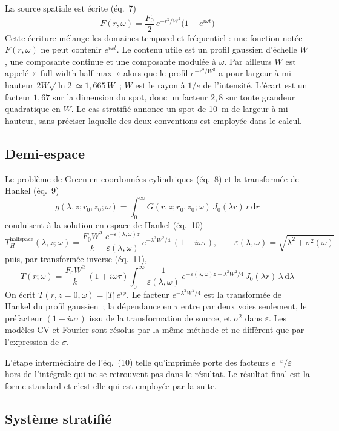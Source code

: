 \documentclass[11pt,a4paper]{article}
\begin{document}
La source spatiale est écrite (éq.~7)
\[
F(r,\omega) = \frac{F_0}{2}\,e^{-r^2/W^2}\big(1 + e^{i\omega t}\big)
\]
Cette écriture mélange les domaines temporel et fréquentiel : une fonction notée $F(r,\omega)$
ne peut contenir $e^{i\omega t}$. Le contenu utile est un profil gaussien d'échelle $W$, une
composante continue et une composante modulée à $\omega$. Par ailleurs $W$ est appelé
«~full-width half max~» alors que le profil $e^{-r^2/W^2}$ a pour largeur à mi-hauteur
$2W\sqrt{\ln 2} \simeq 1{,}665\,W$~; $W$ est le rayon à $1/e$ de l'intensité. L'écart est un
facteur $1{,}67$ sur la dimension du spot, donc un facteur $2{,}8$ sur toute grandeur
quadratique en $W$. Le cas stratifié annonce un spot de 10~\textmu m de largeur à mi-hauteur,
sans préciser laquelle des deux conventions est employée dans le calcul.

\subsection{Demi-espace}

Le problème de Green en coordonnées cylindriques (éq.~8) et la transformée de Hankel (éq.~9)
\[
g(\lambda, z; r_0, z_0; \omega) = \int_0^\infty G(r,z;r_0,z_0;\omega)\,J_0(\lambda r)\,r\,\mathrm{d}r
\]
conduisent à la solution en espace de Hankel (éq.~10)
\[
T_H^{\text{halfspace}}(\lambda, z;\omega)
= \frac{F_0 W^2}{k}\,\frac{e^{-\varepsilon(\lambda,\omega)z}}{\varepsilon(\lambda,\omega)}\,
e^{-\lambda^2 W^2/4}\,(1+i\omega\tau),
\qquad \varepsilon(\lambda,\omega) = \sqrt{\lambda^2 + \sigma^2(\omega)}
\]
puis, par transformée inverse (éq.~11),
\[
T(r;\omega) = \frac{F_0 W^2}{k}\,(1+i\omega\tau)\int_0^\infty
\frac{1}{\varepsilon(\lambda,\omega)}\,
e^{-\varepsilon(\lambda,\omega)z - \lambda^2W^2/4}\,J_0(\lambda r)\,\lambda\,\mathrm{d}\lambda
\]
On écrit $T(r, z=0,\omega) = |T|\,e^{i\phi}$. Le facteur $e^{-\lambda^2 W^2/4}$ est la
transformée de Hankel du profil gaussien~; la dépendance en $\tau$ entre par deux voies
seulement, le préfacteur $(1+i\omega\tau)$ issu de la transformation de source, et $\sigma^2$
dans $\varepsilon$. Les modèles CV et Fourier sont résolus par la même méthode et ne diffèrent
que par l'expression de $\sigma$.

L'étape intermédiaire de l'éq.~(10) telle qu'imprimée porte des facteurs
$e^{-\varepsilon}/\varepsilon$ hors de l'intégrale qui ne se retrouvent pas dans le résultat. Le
résultat final est la forme standard et c'est elle qui est employée par la suite.

\subsection{Système stratifié}
\end{document}
